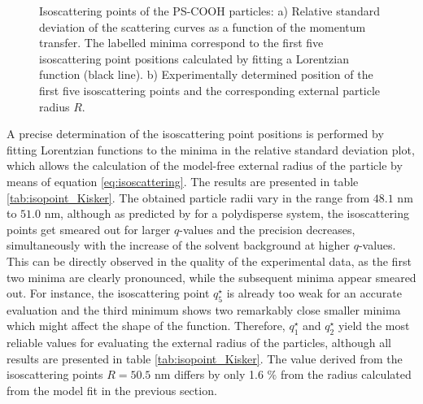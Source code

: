 \begin{figure}%
    \centering
\caption[Isoscattering points of the PS-COOH particles.]{Isoscattering points of the PS-COOH particles: a) Relative standard deviation of the scattering curves as a function of the momentum transfer. The labelled minima correspond to the first five isoscattering point positions calculated by fitting a Lorentzian function (black line). b) Experimentally determined position of the first five isoscattering points and the corresponding external particle radius $R$.}    
\end{figure}

A precise determination of the isoscattering point positions is performed by fitting Lorentzian functions to the minima in the relative standard deviation plot, which allows the calculation of the model-free external radius of the particle by means of equation \eqref{eq:isoscattering}. The results are presented in table \ref{tab:isopoint_Kisker}. The obtained particle radii vary in the range from \(48.1\) nm to \(51.0\) nm, although as predicted by \cite{kawaguchi_isoscattering_1992} for a polydisperse system, the isoscattering points get smeared out for larger \( q \)-values and the precision decreases, simultaneously with the increase of the solvent background at higher \(q\)-values. This can be directly observed in the quality of the experimental data, as the first two minima are clearly pronounced, while the subsequent minima appear smeared out. For instance, the isoscattering point \(q^{\star}_5\) is already too weak for an accurate evaluation and the third minimum shows two remarkably close smaller minima which might affect the shape of the function. Therefore, \(q^{\star}_1\) and \(q^{\star}_2\) yield the most reliable values for evaluating the external radius of the particles, although all results are presented in table \ref{tab:isopoint_Kisker}. The value derived from the isoscattering points \(R=50.5\) nm differs by only 1.6 $\%$ from the radius calculated from the model fit in the previous section.

